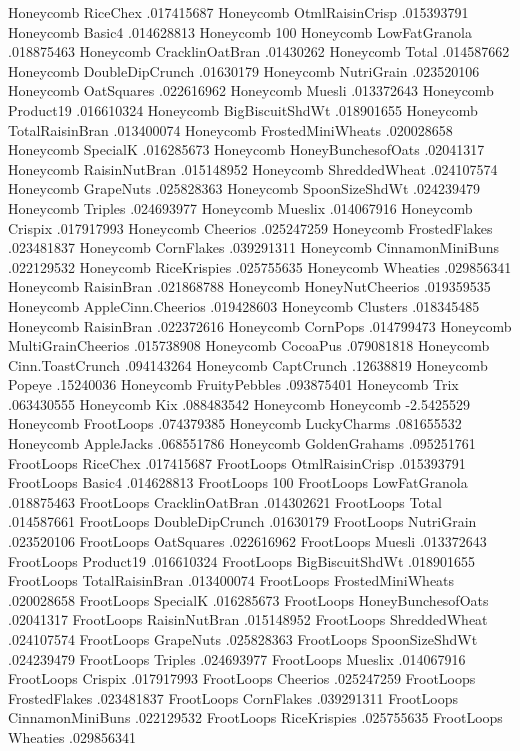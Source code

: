 Honeycomb	RiceChex	.017415687
Honeycomb	OtmlRaisinCrisp	.015393791
Honeycomb	Basic4	.014628813
Honeycomb	100%
Honeycomb	LowFatGranola	.018875463
Honeycomb	CracklinOatBran	.01430262
Honeycomb	Total	.014587662
Honeycomb	DoubleDipCrunch	.01630179
Honeycomb	NutriGrain	.023520106
Honeycomb	OatSquares	.022616962
Honeycomb	Muesli	.013372643
Honeycomb	Product19	.016610324
Honeycomb	BigBiscuitShdWt	.018901655
Honeycomb	TotalRaisinBran	.013400074
Honeycomb	FrostedMiniWheats	.020028658
Honeycomb	SpecialK	.016285673
Honeycomb	HoneyBunchesofOats	.02041317
Honeycomb	RaisinNutBran	.015148952
Honeycomb	ShreddedWheat	.024107574
Honeycomb	GrapeNuts	.025828363
Honeycomb	SpoonSizeShdWt	.024239479
Honeycomb	Triples	.024693977
Honeycomb	Mueslix	.014067916
Honeycomb	Crispix	.017917993
Honeycomb	Cheerios	.025247259
Honeycomb	FrostedFlakes	.023481837
Honeycomb	CornFlakes	.039291311
Honeycomb	CinnamonMiniBuns	.022129532
Honeycomb	RiceKrispies	.025755635
Honeycomb	Wheaties	.029856341
Honeycomb	RaisinBran	.021868788
Honeycomb	HoneyNutCheerios	.019359535
Honeycomb	AppleCinn.Cheerios	.019428603
Honeycomb	Clusters	.018345485
Honeycomb	RaisinBran	.022372616
Honeycomb	CornPops	.014799473
Honeycomb	MultiGrainCheerios	.015738908
Honeycomb	CocoaPus	.079081818
Honeycomb	Cinn.ToastCrunch	.094143264
Honeycomb	CaptCrunch	.12638819
Honeycomb	Popeye	.15240036
Honeycomb	FruityPebbles	.093875401
Honeycomb	Trix	.063430555
Honeycomb	Kix	.088483542
Honeycomb	Honeycomb	-2.5425529
Honeycomb	FrootLoops	.074379385
Honeycomb	LuckyCharms	.081655532
Honeycomb	AppleJacks	.068551786
Honeycomb	GoldenGrahams	.095251761
FrootLoops	RiceChex	.017415687
FrootLoops	OtmlRaisinCrisp	.015393791
FrootLoops	Basic4	.014628813
FrootLoops	100%
FrootLoops	LowFatGranola	.018875463
FrootLoops	CracklinOatBran	.014302621
FrootLoops	Total	.014587661
FrootLoops	DoubleDipCrunch	.01630179
FrootLoops	NutriGrain	.023520106
FrootLoops	OatSquares	.022616962
FrootLoops	Muesli	.013372643
FrootLoops	Product19	.016610324
FrootLoops	BigBiscuitShdWt	.018901655
FrootLoops	TotalRaisinBran	.013400074
FrootLoops	FrostedMiniWheats	.020028658
FrootLoops	SpecialK	.016285673
FrootLoops	HoneyBunchesofOats	.02041317
FrootLoops	RaisinNutBran	.015148952
FrootLoops	ShreddedWheat	.024107574
FrootLoops	GrapeNuts	.025828363
FrootLoops	SpoonSizeShdWt	.024239479
FrootLoops	Triples	.024693977
FrootLoops	Mueslix	.014067916
FrootLoops	Crispix	.017917993
FrootLoops	Cheerios	.025247259
FrootLoops	FrostedFlakes	.023481837
FrootLoops	CornFlakes	.039291311
FrootLoops	CinnamonMiniBuns	.022129532
FrootLoops	RiceKrispies	.025755635
FrootLoops	Wheaties	.029856341

